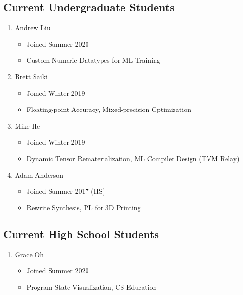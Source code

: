 \documentclass[10pt]{article}
\begin{document}
\subsection*{Current Undergraduate Students}

\begin{enumerate}[resume]
  \item Andrew Liu
    \begin{itemize}
      \item Joined Summer 2020
      \item Custom Numeric Datatypes for ML Training
    \end{itemize}

  \item Brett Saiki
    \begin{itemize}
      \item Joined Winter 2019
      \item Floating-point Accuracy, Mixed-precision Optimization
    \end{itemize}

  \item Mike He
    \begin{itemize}
      \item Joined Winter 2019
      \item Dynamic Tensor Rematerialization, ML Compiler Design (TVM Relay)
    \end{itemize}

  \item Adam Anderson
    \begin{itemize}
      \item Joined Summer 2017 (HS)
      \item Rewrite Synthesis, PL for 3D Printing
    \end{itemize}
\end{enumerate}

\subsection*{Current High School Students}

\begin{enumerate}[resume]
  \item Grace Oh
    \begin{itemize}
      \item Joined Summer 2020
      \item Program State Visualization, CS Education
    \end{itemize}
\end{enumerate}
\end{document}
